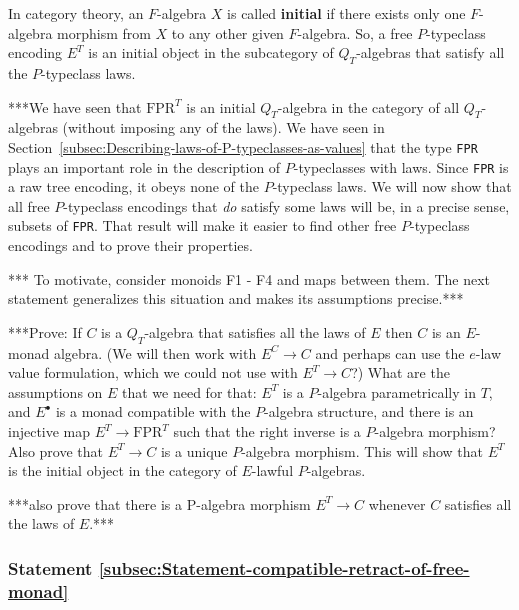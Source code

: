 In category theory, an $F$-algebra $X$ is called \textbf{initial}
if there exists only one $F$-algebra morphism from $X$ to any other
given $F$-algebra. So, a free $P$-typeclass encoding $E^{T}$ is
an initial object in the subcategory of $Q_{T}$-algebras that satisfy
all the $P$-typeclass laws.

{*}{*}{*}We have seen that $\text{FPR}^{T}$ is an initial $Q_{T}$-algebra
in the category of all $Q_{T}$-algebras (without imposing any of
the laws). We have seen in Section~\ref{subsec:Describing-laws-of-P-typeclasses-as-values}
that the type \lstinline!FPR!
plays an important role in the description of $P$-typeclasses with
laws. Since \lstinline!FPR!
is a raw tree encoding, it obeys none of the $P$-typeclass laws.
We will now show that all free $P$-typeclass encodings that \emph{do}
satisfy some laws will be, in a precise sense, subsets of \lstinline!FPR!.
That result will make it easier to find other free $P$-typeclass
encodings and to prove their properties.

{*}{*}{*} To motivate, consider monoids F1 - F4 and maps between them.
The next statement generalizes this situation and makes its assumptions
precise.{*}{*}{*}

{*}{*}{*}Prove: If $C$ is a $Q_{T}$-algebra that satisfies all the
laws of $E$ then $C$ is an $E$-monad algebra. (We will then work
with $E^{C}\rightarrow C$ and perhaps can use the $e$-law value
formulation, which we could not use with $E^{T}\rightarrow C$?) What
are the assumptions on $E$ that we need for that: $E^{T}$ is a $P$-algebra
parametrically in $T$, and $E^{\bullet}$ is a monad compatible with
the $P$-algebra structure, and there is an injective map $E^{T}\rightarrow\text{FPR}^{T}$
such that the right inverse is a $P$-algebra morphism? Also prove
that $E^{T}\rightarrow C$ is a unique $P$-algebra morphism. This
will show that $E^{T}$ is the initial object in the category of $E$-lawful
$P$-algebras.

{*}{*}{*}also prove that there is a P-algebra morphism $E^{T}\rightarrow C$
whenever $C$ satisfies all the laws of $E$.{*}{*}{*}

\subsubsection{Statement \label{subsec:Statement-compatible-retract-of-free-monad}\ref{subsec:Statement-compatible-retract-of-free-monad}}

